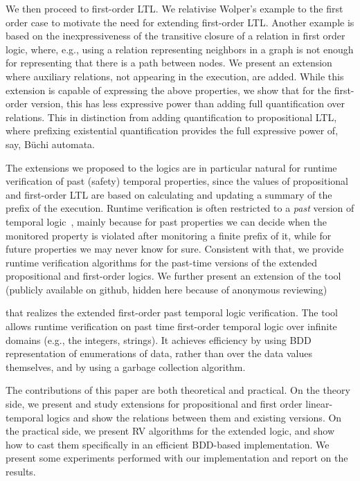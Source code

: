 We then proceed to first-order LTL. We relativise Wolper's example to the first
order case to motivate the need for
extending first-order LTL. Another example is based on the inexpressiveness of the transitive closure of a relation in first order logic, where, e.g., using a relation representing neighbors in a graph is not enough for representing that there is a path between nodes.
We present an extension where auxiliary relations, not appearing in the execution, are
added. While this extension
is capable of expressing the above
properties, we show that for the first-order version, this has less 
expressive power than adding full quantification over relations. This in distinction from adding quantification to propositional LTL, where prefixing existential quantification
provides the full expressive power of, say, B\"{u}chi automata.

The extensions we proposed to the logics are in particular natural for
runtime verification of past (safety) temporal properties, since
the values of propositional and first-order LTL are based
on calculating and updating a summary of the prefix of the execution. Runtime verification is often restricted to a {\em past}  version of temporal logic~\cite{HR}, mainly because for past properties we can decide when the monitored property is violated after monitoring a finite prefix of it, while for future properties we may never know for sure. Consistent with that, 
we provide runtime verification algorithms for the past-time versions of the extended propositional and first-order
logics. We further present an extension of the 
\dejavu{} tool (publicly available on {\sf github},
hidden here because of anonymous reviewing)
 that
realizes the extended first-order past temporal logic verification. The \dejavu{} tool~\cite{HPU,HP} allows runtime verification on past time first-order temporal logic over infinite domains (e.g., the integers, strings). It achieves efficiency by using BDD representation of enumerations of data, rather than over the data values themselves, and by using
a garbage collection algorithm. 

The contributions of this paper are both theoretical and practical. On the theory side, we present and study extensions for propositional and first order linear-temporal logics and show the relations between them and existing versions. 
On the practical side, we present RV algorithms for the extended logic, and 
show how to cast them specifically in an efficient BDD-based implementation. We present some experiments performed with our implementation and report on the results. 

